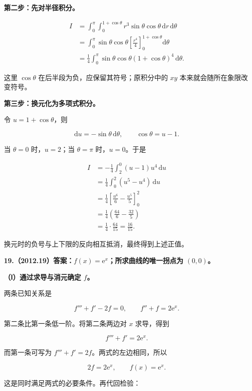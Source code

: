 \documentclass[UTF8,11pt,fontset=windows]{ctexart}
\begin{document}
\textbf{第二步：先对半径积分。}

$$
\begin{aligned}
I
&=\int_0^\pi\int_0^{1+\cos\theta}
 r^3\sin\theta\cos\theta\,\mathrm dr\,\mathrm d\theta\\
&=\int_0^\pi\sin\theta\cos\theta
 \left[\frac{r^4}{4}\right]_0^{1+\cos\theta}\mathrm d\theta\\
&=\frac14\int_0^\pi
 \sin\theta\cos\theta(1+\cos\theta)^4\,\mathrm d\theta.
\end{aligned}
$$

这里 $\cos\theta$ 在后半段为负，应保留其符号；原积分中的 $xy$ 本来就会随所在象限改变符号。

\textbf{第三步：换元化为多项式积分。}

令 $u=1+\cos\theta$，则

$$
\mathrm du=-\sin\theta\,\mathrm d\theta,
\qquad\cos\theta=u-1.
$$

当 $\theta=0$ 时，$u=2$；当 $\theta=\pi$ 时，$u=0$。于是

$$
\begin{aligned}
I
&=-\frac14\int_2^0(u-1)u^4\,\mathrm du\\
&=\frac14\int_0^2(u^5-u^4)\,\mathrm du\\
&=\frac14\left[\frac{u^6}{6}-\frac{u^5}{5}\right]_0^2\\
&=\frac14\left(\frac{64}{6}-\frac{32}{5}\right)\\
&=\frac14\cdot\frac{64}{15}
=\frac{16}{15}.
\end{aligned}
$$

换元时的负号与上下限的反向相互抵消，最终得到上述正值。

\clearpage

\textbf{19.（2012.19）答案：$f(x)=\mathrm e^x$；所求曲线的唯一拐点为 $(0,0)$。}

\textbf{（Ⅰ）通过求导与消元确定 $f$。}

两条已知关系是

$$
f'''+f'-2f=0,
\qquad f''+f=2\mathrm e^x.
$$

第二条比第一条低一阶。将第二条两边对 $x$ 求导，得到

$$
f'''+f'=2\mathrm e^x.
$$

而第一条可写为 $f'''+f'=2f$。两式的左边相同，所以

$$
2f=2\mathrm e^x,
\qquad f(x)=\mathrm e^x.
$$

这是同时满足两式的必要条件。再代回检验：
\end{document}
